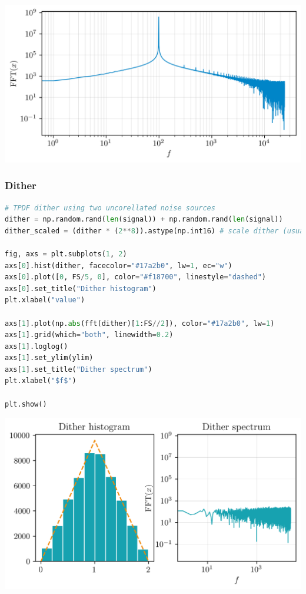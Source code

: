\includegraphics{./img/83e40ac8704f77e2f58a6800bc3e6c99c2c385d0.png}

\hypertarget{dither}{%
\subsubsection{Dither}\label{dither}}

\begin{lstlisting}[language=Python]
# TPDF dither using two uncorellated noise sources
dither = np.random.rand(len(signal)) + np.random.rand(len(signal))
dither_scaled = (dither * (2**8)).astype(np.int16) # scale dither (usually only to 1 LSB)

fig, axs = plt.subplots(1, 2)
axs[0].hist(dither, facecolor="#17a2b0", lw=1, ec="w")
axs[0].plot([0, FS/5, 0], color="#f18700", linestyle="dashed")
axs[0].set_title("Dither histogram")
plt.xlabel("value")

axs[1].plot(np.abs(fft(dither)[1:FS//2]), color="#17a2b0", lw=1)
axs[1].grid(which="both", linewidth=0.2)
axs[1].loglog()
axs[1].set_ylim(ylim)
axs[1].set_title("Dither spectrum")
plt.xlabel("$f$")

plt.show()
\end{lstlisting}

\includegraphics{./img/5471d313422eed63396a88ef6e668194d821502f.png}

